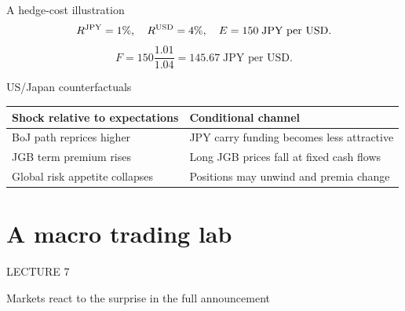 \documentclass[12pt,aspectratio=169]{beamer}
\begin{document}

\begin{frame}{A hedge-cost illustration}
\[R^{\rm JPY}=1\%,\quad R^{\rm USD}=4\%,\quad E=150\;\text{JPY per USD}.\]\[F=150\frac{1.01}{1.04}=145.67\;\text{JPY per USD}.\]
\end{frame}


\begin{frame}{US/Japan counterfactuals}
\begin{center}\begin{tabular}{@{}p{}p{}@{}}\toprule \textbf{Shock relative to expectations} & \textbf{Conditional channel}\\\midrule BoJ path reprices higher & JPY carry funding becomes less attractive\\[2mm]
JGB term premium rises & Long JGB prices fall at fixed cash flows\\[2mm]
Global risk appetite collapses & Positions may unwind and premia change\\\bottomrule\end{tabular}\end{center}
\end{frame}

\section[A macro trading lab]{A macro trading lab}
\begin{frame}[plain]
{\color{Gold}\large LECTURE 7}\par\vspace{9mm}{\Huge\bfseries A macro trading lab}\par\vspace{7mm}{\Large How does a conditional view become a sized position?}
\end{frame}


\begin{frame}{Markets react to the surprise in the full announcement}
\end{frame}
\end{document}
